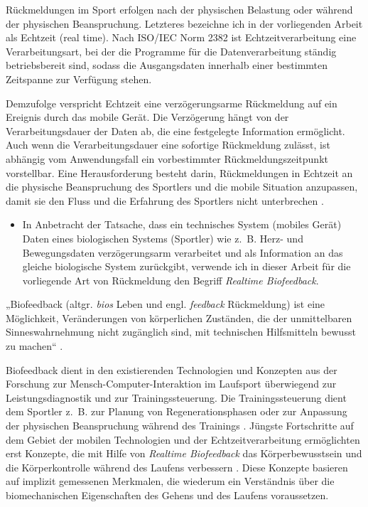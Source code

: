 Rückmeldungen im Sport erfolgen nach der physischen Belastung oder während der physischen Beanspruchung. Letzteres bezeichne ich in der vorliegenden Arbeit als Echtzeit (real time). Nach ISO/IEC Norm 2382 ist Echtzeitverarbeitung eine Verarbeitungsart, bei der die Programme für die Datenverarbeitung ständig betriebsbereit sind, sodass die Ausgangsdaten innerhalb einer bestimmten Zeitspanne zur Verfügung stehen.

Demzufolge verspricht Echtzeit eine verzögerungsarme Rückmeldung auf ein Ereignis durch das mobile Gerät. Die Verzögerung hängt von der Verarbeitungsdauer der Daten ab, die eine festgelegte Information ermöglicht. Auch wenn die Verarbeitungsdauer eine sofortige Rückmeldung zulässt, ist abhängig vom Anwendungsfall ein vorbestimmter Rückmeldungszeitpunkt vorstellbar. Eine Herausforderung besteht darin, Rückmeldungen in Echtzeit an die physische Beanspruchung des Sportlers und die mobile Situation anzupassen, damit sie den Fluss und die Erfahrung des Sportlers nicht unterbrechen \citep{Nylander2014}. 
\begin{itemize}
	
	\item In Anbetracht der Tatsache, dass ein technisches System (mobiles Gerät) Daten eines biologischen Systems (Sportler) wie z.~B. Herz- und Bewegungsdaten verzögerungsarm verarbeitet und als Information an das gleiche biologische System zurückgibt, verwende ich in dieser Arbeit für die vorliegende Art von Rückmeldung den Begriff \emph{Realtime Biofeedback}. 
\end{itemize}

„Biofeedback (altgr. \emph{bios} Leben und engl. \emph{feedback} Rückmeldung) ist eine Möglichkeit, Veränderungen von körperlichen Zuständen, die der unmittelbaren Sinneswahrnehmung nicht zugänglich sind, mit technischen Hilfsmitteln bewusst zu machen“ \citep[][S.~483]{Riemer2015}.

Biofeedback dient in den existierenden Technologien und Konzepten aus der Forschung zur Mensch-Computer-Interaktion im Laufsport überwiegend zur Leistungsdiagnostik und zur Trainingssteuerung. Die Trainingssteuerung dient dem Sportler z.~B. zur Planung von Regenerationsphasen oder zur Anpassung der physischen Beanspruchung während des Trainings \citep[][S.~81-107]{Marquardt2011}. Jüngste Fortschritte auf dem Gebiet der mobilen Technologien und der Echtzeitverarbeitung ermöglichten erst Konzepte, die mit Hilfe von \emph{Realtime Biofeedback} das Körperbewusstsein und die Körperkontrolle während des Laufens verbessern \citep{Strohrmann2013, Strohrmann2013a, Strohrmann2014}. Diese Konzepte basieren auf implizit gemessenen Merkmalen, die wiederum ein Verständnis über die biomechanischen Eigenschaften des Gehens und des Laufens voraussetzen. 

